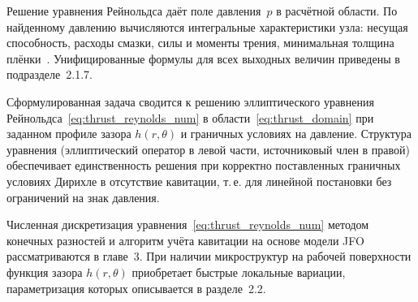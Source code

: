 Решение уравнения Рейнольдса даёт поле давления~$p$ в расчётной области. По найденному давлению вычисляются интегральные характеристики узла: несущая способность, расходы смазки, силы и моменты трения, минимальная толщина плёнки~\cite{majumdar2004}. Унифицированные формулы для всех выходных величин приведены в подразделе~2.1.7.

Сформулированная задача сводится к решению эллиптического уравнения Рейнольдса~\eqref{eq:thrust_reynolds_num} в области~\eqref{eq:thrust_domain} при заданном профиле зазора $h(r,\theta)$ и граничных условиях на давление. Структура уравнения (эллиптический оператор в левой части, источниковый член в правой) обеспечивает единственность решения при корректно поставленных граничных условиях Дирихле в отсутствие кавитации, т.\,е. для линейной постановки без ограничений на знак давления.

Численная дискретизация уравнения~\eqref{eq:thrust_reynolds_num} методом конечных разностей и алгоритм учёта кавитации на основе модели JFO рассматриваются в главе~3. При наличии микроструктур на рабочей поверхности функция зазора $h(r,\theta)$ приобретает быстрые локальные вариации, параметризация которых описывается в разделе~2.2.

